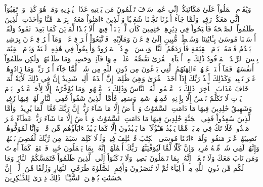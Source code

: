 وَيَٰقَوۡمِ ٱعۡمَلُواْ عَلَىٰ مَكَانَتِكُمۡ إِنِّي عَٰمِلٞۖ سَوۡفَ تَعۡلَمُونَ مَن يَأۡتِيهِ عَذَابٞ يُخۡزِيهِ وَمَنۡ هُوَ كَٰذِبٞۖ وَٱرۡتَقِبُوٓاْ إِنِّي مَعَكُمۡ رَقِيبٞ
وَلَمَّا جَآءَ أَمۡرُنَا نَجَّيۡنَا شُعَيۡبٗا وَٱلَّذِينَ ءَامَنُواْ مَعَهُۥ بِرَحۡمَةٖ مِّنَّا وَأَخَذَتِ ٱلَّذِينَ ظَلَمُواْ ٱلصَّيۡحَةُ فَأَصۡبَحُواْ فِي دِيَٰرِهِمۡ جَٰثِمِينَ
كَأَن لَّمۡ يَغۡنَوۡاْ فِيهَآۗ أَلَا بُعۡدٗا لِّمَدۡيَنَ كَمَا بَعِدَتۡ ثَمُودُ
وَلَقَدۡ أَرۡسَلۡنَا مُوسَىٰ بِـَٔايَٰتِنَا وَسُلۡطَٰنٖ مُّبِينٍ
إِلَىٰ فِرۡعَوۡنَ وَمَلَإِيْهِۦ فَٱتَّبَعُوٓاْ أَمۡرَ فِرۡعَوۡنَۖ وَمَآ أَمۡرُ فِرۡعَوۡنَ بِرَشِيدٖ
يَقۡدُمُ قَوۡمَهُۥ يَوۡمَ ٱلۡقِيَٰمَةِ فَأَوۡرَدَهُمُ ٱلنَّارَۖ وَبِئۡسَ ٱلۡوِرۡدُ ٱلۡمَوۡرُودُ
وَأُتۡبِعُواْ فِي هَٰذِهِۦ لَعۡنَةٗ وَيَوۡمَ ٱلۡقِيَٰمَةِۚ بِئۡسَ ٱلرِّفۡدُ ٱلۡمَرۡفُودُ
ذَٰلِكَ مِنۡ أَنۢبَآءِ ٱلۡقُرَىٰ نَقُصُّهُۥ عَلَيۡكَۖ مِنۡهَا قَآئِمٞ وَحَصِيدٞ
وَمَا ظَلَمۡنَٰهُمۡ وَلَٰكِن ظَلَمُوٓاْ أَنفُسَهُمۡۖ فَمَآ أَغۡنَتۡ عَنۡهُمۡ ءَالِهَتُهُمُ ٱلَّتِي يَدۡعُونَ مِن دُونِ ٱللَّهِ مِن شَيۡءٖ لَّمَّا جَآءَ أَمۡرُ رَبِّكَۖ وَمَا زَادُوهُمۡ غَيۡرَ تَتۡبِيبٖ
وَكَذَٰلِكَ أَخۡذُ رَبِّكَ إِذَآ أَخَذَ ٱلۡقُرَىٰ وَهِيَ ظَٰلِمَةٌۚ إِنَّ أَخۡذَهُۥٓ أَلِيمٞ شَدِيدٌ
إِنَّ فِي ذَٰلِكَ لَأٓيَةٗ لِّمَنۡ خَافَ عَذَابَ ٱلۡأٓخِرَةِۚ ذَٰلِكَ يَوۡمٞ مَّجۡمُوعٞ لَّهُ ٱلنَّاسُ وَذَٰلِكَ يَوۡمٞ مَّشۡهُودٞ
وَمَا نُؤَخِّرُهُۥٓ إِلَّا لِأَجَلٖ مَّعۡدُودٖ
يَوۡمَ يَأۡتِ لَا تَكَلَّمُ نَفۡسٌ إِلَّا بِإِذۡنِهِۦۚ فَمِنۡهُمۡ شَقِيّٞ وَسَعِيدٞ
فَأَمَّا ٱلَّذِينَ شَقُواْ فَفِي ٱلنَّارِ لَهُمۡ فِيهَا زَفِيرٞ وَشَهِيقٌ
خَٰلِدِينَ فِيهَا مَا دَامَتِ ٱلسَّمَٰوَٰتُ وَٱلۡأَرۡضُ إِلَّا مَا شَآءَ رَبُّكَۚ إِنَّ رَبَّكَ فَعَّالٞ لِّمَا يُرِيدُ
۞وَأَمَّا ٱلَّذِينَ سُعِدُواْ فَفِي ٱلۡجَنَّةِ خَٰلِدِينَ فِيهَا مَا دَامَتِ ٱلسَّمَٰوَٰتُ وَٱلۡأَرۡضُ إِلَّا مَا شَآءَ رَبُّكَۖ عَطَآءً غَيۡرَ مَجۡذُوذٖ
فَلَا تَكُ فِي مِرۡيَةٖ مِّمَّا يَعۡبُدُ هَـٰٓؤُلَآءِۚ مَا يَعۡبُدُونَ إِلَّا كَمَا يَعۡبُدُ ءَابَآؤُهُم مِّن قَبۡلُۚ وَإِنَّا لَمُوَفُّوهُمۡ نَصِيبَهُمۡ غَيۡرَ مَنقُوصٖ
وَلَقَدۡ ءَاتَيۡنَا مُوسَى ٱلۡكِتَٰبَ فَٱخۡتُلِفَ فِيهِۚ وَلَوۡلَا كَلِمَةٞ سَبَقَتۡ مِن رَّبِّكَ لَقُضِيَ بَيۡنَهُمۡۚ وَإِنَّهُمۡ لَفِي شَكّٖ مِّنۡهُ مُرِيبٖ
وَإِنَّ كُلّٗا لَّمَّا لَيُوَفِّيَنَّهُمۡ رَبُّكَ أَعۡمَٰلَهُمۡۚ إِنَّهُۥ بِمَا يَعۡمَلُونَ خَبِيرٞ
فَٱسۡتَقِمۡ كَمَآ أُمِرۡتَ وَمَن تَابَ مَعَكَ وَلَا تَطۡغَوۡاْۚ إِنَّهُۥ بِمَا تَعۡمَلُونَ بَصِيرٞ
وَلَا تَرۡكَنُوٓاْ إِلَى ٱلَّذِينَ ظَلَمُواْ فَتَمَسَّكُمُ ٱلنَّارُ وَمَا لَكُم مِّن دُونِ ٱللَّهِ مِنۡ أَوۡلِيَآءَ ثُمَّ لَا تُنصَرُونَ
وَأَقِمِ ٱلصَّلَوٰةَ طَرَفَيِ ٱلنَّهَارِ وَزُلَفٗا مِّنَ ٱلَّيۡلِۚ إِنَّ ٱلۡحَسَنَٰتِ يُذۡهِبۡنَ ٱلسَّيِّـَٔاتِۚ ذَٰلِكَ ذِكۡرَىٰ لِلذَّـٰكِرِينَ
